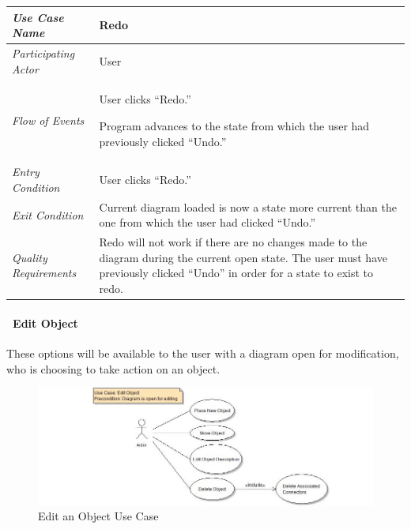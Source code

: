 \documentclass[twoside,letterpaper]{article}
\newenvironment{my_enumerate}{
\begin{enumerate}
  \setlength{\itemsep}{1pt}
  \setlength{\parskip}{0pt}
  \setlength{\parsep}{0pt}}{\end{enumerate}
}
\begin{document}
\begin{flushleft}
\tablehead{}
\begin{tabular}{|m{2.0in} m{5.0in}|}
\hline
{\bfseries\emph{Use Case Name}}
& {\bfseries Redo}
\\\hline
\emph{Participating Actor}
& User
\\\hline
\emph{Flow of Events}
& \begin{my_enumerate}
\item User clicks ``Redo.''
\item Program advances to the state from which the user had previously clicked ``Undo.''
\end{my_enumerate}
\\\hline
\emph{Entry Condition}
&  User clicks ``Redo.''
\\\hline
\emph{Exit Condition}
& Current diagram loaded is now a state more current than the one from which the user had clicked ``Undo.''
\\\hline
\emph{Quality Requirements}
& Redo will not work if there are no changes made to the diagram during the current open state. The user must have previously clicked ``Undo'' in order for a  state to exist to redo.
\\\hline
\end{tabular}
\end{flushleft}
\bigskip



\clearpage

\paragraph[\ Use Category]
{\ Edit Object} {These options will be available to the user with a diagram open for modification, who is choosing to take action on an object.}

\begin{figure}[h]
\centering
\includegraphics[width=6.0in]{ucaseEditObj.jpg}
\caption{Edit an Object Use Case}
\end{figure}
\end{document}
